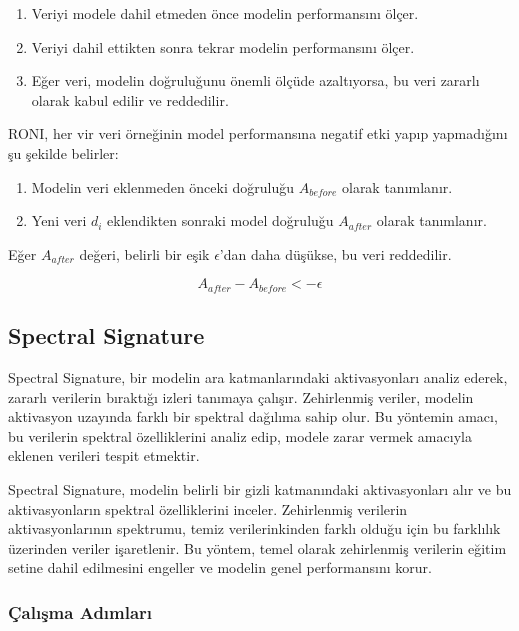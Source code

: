 \begin{enumerate}
    \item Veriyi modele dahil etmeden önce modelin performansını ölçer.
    \item Veriyi dahil ettikten sonra tekrar modelin performansını ölçer.
    \item Eğer veri, modelin doğruluğunu önemli ölçüde azaltıyorsa, bu veri zararlı olarak kabul edilir ve reddedilir.
\end{enumerate}

RONI, her vir veri örneğinin model performansına negatif etki yapıp yapmadığını şu şekilde belirler:

\begin{enumerate}
    \item Modelin veri eklenmeden önceki doğruluğu $A_{before}$ olarak tanımlanır.
    \item Yeni veri $d_i$ eklendikten sonraki model doğruluğu $A_{after}$ olarak tanımlanır.
\end{enumerate}

Eğer $A_{after}$ değeri, belirli bir eşik $\epsilon$'dan daha düşükse, bu veri reddedilir.

\[ A_{after} - A_{before} < -\epsilon \]

\newpage

\subsection{Spectral Signature}

Spectral Signature, bir modelin ara katmanlarındaki aktivasyonları analiz ederek, zararlı verilerin bıraktığı izleri tanımaya çalışır. Zehirlenmiş veriler, modelin aktivasyon uzayında farklı bir spektral dağılıma sahip olur. Bu yöntemin amacı, bu verilerin spektral özelliklerini analiz edip, modele zarar vermek amacıyla eklenen verileri tespit etmektir.

Spectral Signature, modelin belirli bir gizli katmanındaki aktivasyonları alır ve bu aktivasyonların spektral özelliklerini inceler. Zehirlenmiş verilerin aktivasyonlarının spektrumu, temiz verilerinkinden farklı olduğu için bu farklılık üzerinden veriler işaretlenir. Bu yöntem, temel olarak zehirlenmiş verilerin eğitim setine dahil edilmesini engeller ve modelin genel performansını korur.

\subsubsection{Çalışma Adımları}

